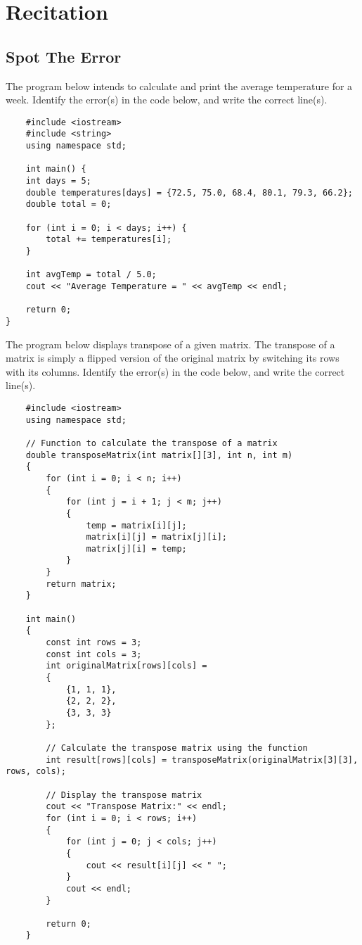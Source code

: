 \section{Recitation}

\subsection{Spot The Error}
\begin{multipart}
The program below intends to calculate and print the average temperature for a week. Identify the error(s) in the code below, and write the correct line(s).
\end{multipart}

\begin{verbatim}
    #include <iostream>
    #include <string>
    using namespace std;

    int main() {
    int days = 5;
    double temperatures[days] = {72.5, 75.0, 68.4, 80.1, 79.3, 66.2};
    double total = 0;

    for (int i = 0; i < days; i++) {
        total += temperatures[i];
    }

    int avgTemp = total / 5.0;
    cout << "Average Temperature = " << avgTemp << endl;

    return 0;
}
\end{verbatim}

\begin{multipart}
The program below displays transpose of a given matrix. The transpose of a matrix is simply a flipped version of the original matrix by switching its rows with its columns. Identify the error(s) in the code below, and write the correct line(s).
\end{multipart}

\begin{verbatim}
    #include <iostream>
    using namespace std;
    
    // Function to calculate the transpose of a matrix
    double transposeMatrix(int matrix[][3], int n, int m) 
    { 
        for (int i = 0; i < n; i++)
        {
            for (int j = i + 1; j < m; j++)
            {
                temp = matrix[i][j];
                matrix[i][j] = matrix[j][i];
                matrix[j][i] = temp;
            }
        }
        return matrix;
    } 
    
    int main() 
    {
        const int rows = 3;
        const int cols = 3;
        int originalMatrix[rows][cols] = 
        {
            {1, 1, 1},
            {2, 2, 2},
            {3, 3, 3}
        };
    
        // Calculate the transpose matrix using the function
        int result[rows][cols] = transposeMatrix(originalMatrix[3][3], rows, cols);
    
        // Display the transpose matrix
        cout << "Transpose Matrix:" << endl;
        for (int i = 0; i < rows; i++) 
        {
            for (int j = 0; j < cols; j++) 
            {
                cout << result[i][j] << " ";
            }
            cout << endl;
        }
    
        return 0;
    }
\end{verbatim}

